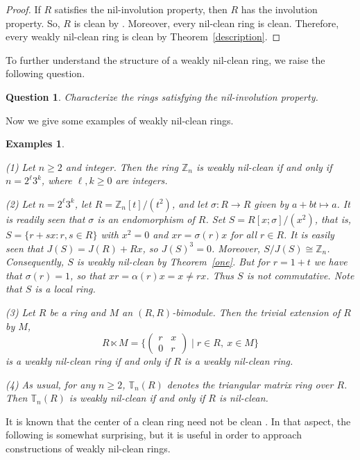 \documentclass[12]{amsart}
\newtheorem{que}[thm]{Question}
\newtheorem{exas}[thm]{Examples}
\theoremstyle{definition}
\numberwithin{equation}{section}
\begin{document}
\begin{proof}
If $R$ satisfies the nil-involution property, then $R$ has the involution property. So, $R$ is clean by
\cite[Theorem 3.5]{FY08}. Moreover, every nil-clean ring is clean. Therefore, every weakly nil-clean ring is clean by
Theorem~\ref{description}.
\end{proof}

To further understand the structure of a weakly nil-clean ring, we raise the following question.

\begin{que}
Characterize the rings satisfying the nil-involution property. 
\end{que}

Now we give some examples of weakly nil-clean rings. 

\begin{exas}\label{exas9}
{\rm (1) Let $n\geq 2$ and integer. Then the ring ${{\mathbb Z}}_n$ is weakly nil-clean if and only if $n=2^\ell 3^k$, where $\ell, k\geq 0$ are integers.

(2) Let $n=2^\ell 3^k$, let $R={\mathbb Z}_n[t]/(t^2)$, and let $\sigma : R\rightarrow R$ given by $a+bt\mapsto a$.
It is readily seen that $\sigma $ is an endomorphism of $R$. Set $S=R[x; \sigma ]/(x^2)$, that is, $S=\{r+sx: r,s\in R\}$ with $x^2=0$ and
$xr=\sigma(r)x$ for all $r\in R$. It is easily seen that $J(S)=J(R)+Rx$, so $J(S)^3=0$. Moreover,
$S/J(S)\cong \mathbb Z_n$. Consequently, $S$ is weakly nil-clean by Theorem~\ref{one}.
But for $r=1+t$ we have that $\sigma (r)=1$, so that $xr=\alpha (r)x=x\not= rx$. Thus $S$ is not commutative. Note that $S$ is a local ring. 

(3) Let $R$ be a ring and $M$ an $(R, R)$-bimodule. Then the trivial extension of $R$ by $M$,
$$R\ltimes M=\Big\{\begin{pmatrix} r & x \\ 0& r\end{pmatrix} \mid r\in R,\ x\in M\Big\}$$ is a weakly nil-clean ring if and only if $R$ is a weakly nil-clean ring.

(4) As usual, for any $n\geq 2$, ${\mathbb T}_n(R)$ denotes the triangular matrix ring over $R$. Then  ${\mathbb T}_n(R)$ is weakly nil-clean if and only if $R$ is nil-clean.}
\end{exas}

It is known that the center of a clean ring need not be clean \cite{BR13}.
In that aspect, the following is somewhat surprising, but it is useful in order to approach constructions of weakly nil-clean rings.
\end{document}
